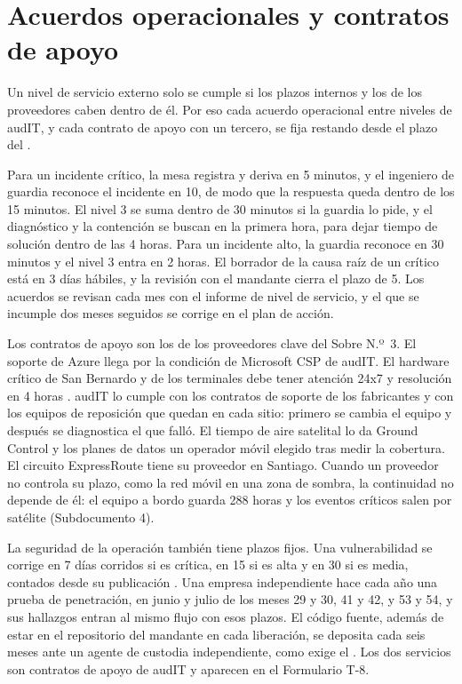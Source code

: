 \section{Acuerdos operacionales y contratos de apoyo}\label{sec:10-acuerdos-operacionales-y-contrat}

Un nivel de servicio externo solo se cumple si los plazos internos y los de los proveedores caben dentro
de él. Por eso cada acuerdo operacional entre niveles de audIT, y cada contrato de apoyo con un tercero,
se fija restando desde el plazo del .

Para un incidente crítico, la mesa registra y deriva en 5 minutos, y el ingeniero de guardia reconoce el
incidente en 10, de modo que la respuesta queda dentro de los 15 minutos. El nivel 3 se suma dentro de
30 minutos si la guardia lo pide, y el diagnóstico y la contención se buscan en la primera hora, para
dejar tiempo de solución dentro de las 4 horas. Para un incidente alto, la guardia reconoce en 30
minutos y el nivel 3 entra en 2 horas. El borrador de la causa raíz de un crítico está en 3 días hábiles,
y la revisión con el mandante cierra el plazo de 5. Los acuerdos se revisan cada mes con el informe de
nivel de servicio, y el que se incumple dos meses seguidos se corrige en el plan de acción.

Los contratos de apoyo son los de los proveedores clave del Sobre N.º~3. El soporte de Azure llega por la
condición de Microsoft CSP de audIT. El hardware crítico de San Bernardo y de los terminales debe tener
atención 24x7 y resolución en 4 horas . audIT lo cumple con los contratos de
soporte de los fabricantes y con los equipos de reposición que quedan en cada sitio: primero se cambia
el equipo y después se diagnostica el que falló. El tiempo de aire satelital lo da Ground Control y los planes de datos un operador móvil
elegido tras medir la cobertura. El circuito ExpressRoute tiene su proveedor en Santiago. Cuando un
proveedor no controla su plazo, como la red móvil en una zona de sombra, la continuidad no depende de
él: el equipo a bordo guarda 288 horas y los eventos críticos salen por satélite (Subdocumento 4).

La seguridad de la operación también tiene plazos fijos. Una vulnerabilidad se corrige en 7 días
corridos si es crítica, en 15 si es alta y en 30 si es media, contados desde su publicación
. Una empresa independiente hace cada año una prueba de penetración, en junio y julio de
los meses 29 y 30, 41 y 42, y 53 y 54, y sus hallazgos entran al mismo flujo con esos plazos. El código
fuente, además de estar en el repositorio del mandante en cada liberación, se deposita cada seis meses
ante un agente de custodia independiente, como exige el . Los dos servicios son contratos
de apoyo de audIT y aparecen en el Formulario T-8.


